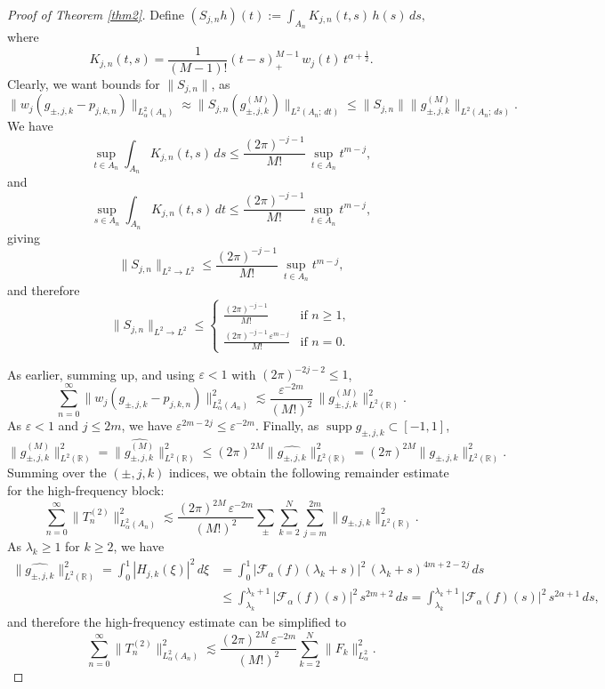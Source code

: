 \documentclass[11pt,a4paper,reqno,dvipsnames]{amsart}
\newcommand{\F}{\mathcal{F}}
\newcommand{\ep}{\varepsilon}
\newcommand{\R}{\mathbb R}
\renewcommand{\ge}{\geqslant}
\renewcommand{\le}{\leqslant}
\numberwithin{equation}{section}
\theoremstyle{plain}
\theoremstyle{definition}
\theoremstyle{remark}
\begin{document}
\begin{proof}[Proof of Theorem \ref{thm2}]
Define $(S_{j,n} h)(t) := \int_{A_n} K_{j,n}(t,s)\, h(s)\, ds,$
where 
$$K_{j,n}(t,s) = \frac{1}{(M-1)!} (t-s)^{M-1}_+\, w_j(t)\, t^{\alpha + \frac{1}{2}}.$$
Clearly, we want bounds for $\|S_{j,n}\|$, as 
$$\|w_j \left(g_{\pm, j,k} - p_{j,k,n} \right)\|_{L^2_\alpha(A_n)} \approx \|S_{j,n}(g_{\pm,j,k}^{(M)})\|_{L^2(A_n;\, dt)} \le \|S_{j,n}\| \|g_{\pm,j,k}^{(M)}\|_{L^2(A_n;\, ds)}.$$
We have 
$$\sup_{t\in A_n}\int_{A_n} K_{j,n}(t,s)\, ds \le \frac{(2\pi)^{-j-1}}{M!}\, \sup_{t\in A_n} t^{m-j},$$
and 
$$\sup_{s\in A_n}\int_{A_n} K_{j,n}(t,s)\, dt \le \frac{(2\pi)^{-j-1}}{M!}\, \sup_{t\in A_n} t^{m-j},$$
giving 
$$\|S_{j,n}\|_{L^2\to L^2} \le \frac{(2\pi)^{-j-1}}{M!}\, \sup_{t\in A_n} t^{m-j},$$
and therefore
$$\|S_{j,n}\|_{L^2\to L^2} \le \begin{cases}
    \frac{(2\pi)^{-j-1}}{M!} & \text{if }n\ge 1,\\
    \frac{(2\pi)^{-j-1}\, \ep^{m-j}}{M!} & \text{if }n=0.
\end{cases}$$

As earlier, summing up, and using $\ep < 1$ with $(2\pi)^{-2j-2} \le 1$, 
$$\sum_{n=0}^\infty \|w_j \left(g_{\pm, j,k} - p_{j,k,n} \right)\|_{L^2_\alpha(A_n)}^2 \lesssim \frac{\ep^{-2m}}{(M!)^2} \, \|g_{\pm,j,k}^{(M)}\|_{L^2(\R)}^2.$$
As $\ep < 1$ and $j \le 2m$, we have $\ep^{2m-2j} \le \ep^{-2m}$. Finally, as $\operatorname{supp} g_{\pm,j,k} \subset [-1,1]$, 
$$\|g_{\pm,j,k}^{(M)}\|_{L^2(\R)}^2 = \|\widehat{g_{\pm,j,k}^{(M)}}\|_{L^2(\R)}^2 \le (2\pi)^{2M} \|\widehat{g_{\pm,j,k}}\|^2_{L^2(\R)} = (2\pi)^{2M} \|g_{\pm,j,k}\|^2_{L^2(\R)}.$$
Summing over the $(\pm, j, k)$ indices, we obtain the following remainder estimate for the high-frequency block:
$$\sum_{n=0}^\infty \|T_n^{(2)}\|^2_{L^2_\alpha(A_n)} \lesssim \frac{(2\pi)^{2M}\, \ep^{-2m}}{(M!)^2} \sum_{\pm} \sum_{k=2}^N \sum_{j=m}^{2m} \|g_{\pm,j,k}\|^2_{L^2(\R)}.$$
As $\lambda_k \ge 1$ for $k \ge 2$, we have
\begin{align*}
    \|\widehat{g_{\pm,j,k}}\|_{L^2(\R)}^2 = \int_0^1 |H_{j,k}(\xi)|^2\, d\xi &= \int_0^1 |\F_\alpha(f)(\lambda_k + s)|^2 \, (\lambda_k + s)^{4m+2-2j}\, ds\\
    &\le \int_{\lambda_k}^{\lambda_k + 1} |\F_\alpha (f)(s)|^2\, s^{2m+2}\, ds = \int_{\lambda_k}^{\lambda_k + 1} |\F_\alpha (f)(s)|^2\, s^{2\alpha + 1}\, ds,
\end{align*}
and therefore the high-frequency estimate can be simplified to 
$$\sum_{n=0}^\infty \|T_n^{(2)}\|^2_{L^2_\alpha(A_n)} \lesssim \frac{(2\pi)^{2M}\, \ep^{-2m}}{(M!)^2} \sum_{k=2}^N \|F_k\|^2_{L^2_\alpha}.$$


\end{proof}
\end{document}
